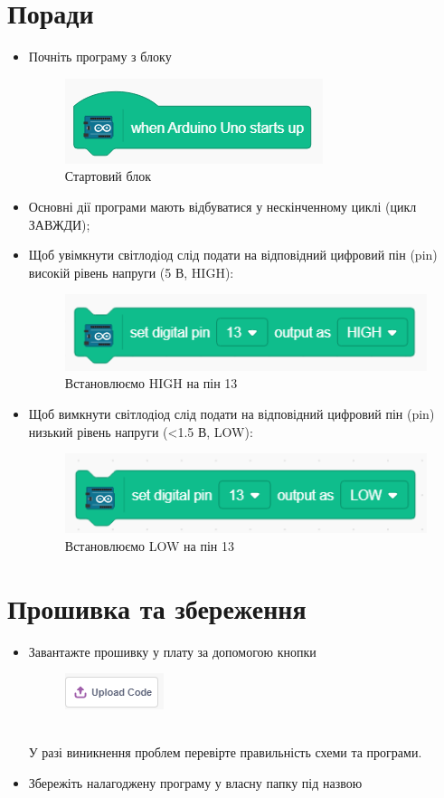 \documentclass[oneside, final]{article}
\begin{document}
\section{Поради}
	\begin{itemize}
		\item Почніть програму з блоку
			\begin{figure}[!ht]
				\centering
				\includegraphics[scale=0.75]{UNO_start.png}
				\caption{Стартовий блок}
			\end{figure}
		\item Основні дії програми мають відбуватися у нескінченному циклі (цикл ЗАВЖДИ);
		\item Щоб увімкнути світлодіод слід подати на відповідний цифровий пін (pin) високій рівень напруги (5 В, HIGH):
			\begin{figure}[!ht]
				\centering
				\includegraphics[scale=0.75]{setPin13HIGH.png}
				\caption{Встановлюємо HIGH на пін 13 }
			\end{figure}
		\item Щоб вимкнути світлодіод слід подати на відповідний цифровий пін (pin) низький рівень напруги (<1.5 В, LOW):
			\begin{figure}[!ht]
				\centering
				\includegraphics[scale=0.75]{setPin13LOW.png}
				\caption{Встановлюємо LOW на пін 13}
			\end{figure}
	\end{itemize}

\section{Прошивка та збереження}
	\begin{itemize}
	\item Завантажте прошивку у плату за допомогою кнопки
		\begin{figure}[!ht]
			\centering
			\includegraphics[]{upload.png}
		\end{figure}
		\\У разі виникнення проблем перевірте правильність схеми та програми.
	\item Збережіть налагоджену програму у власну папку під назвою 
\end{itemize}
\end{document}
